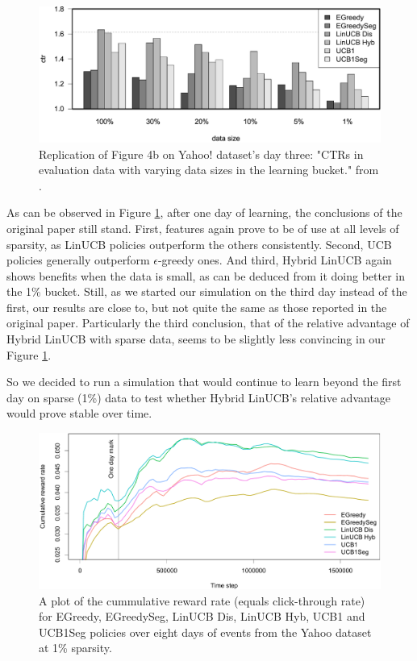 \documentclass{jss}
\begin{document}
\begin{figure}[H]
  \centering
    \includegraphics[width=.99\textwidth]{fig/section_8_bar}
      \caption{Replication of Figure 4b on Yahoo! dataset's day three: "CTRs in evaluation data with varying data sizes in the learning bucket." from \cite{Li2010}.}
      \label{fig:section_8_bar}
\end{figure}

As can be observed in Figure \ref{fig:section_8_bar}, after one day of learning, the conclusions of the original paper still stand. First, features again prove to be of use at all levels of sparsity, as LinUCB policies outperform the others consistently. Second, UCB policies generally outperform $\epsilon$-greedy ones. And third, Hybrid LinUCB again shows benefits when the data is small, as can be deduced from it doing better in the 1\% bucket. Still, as we started our simulation on the third day instead of the first, our results are close to, but not quite the same as those reported in the original paper. Particularly the third conclusion, that of the relative advantage of Hybrid LinUCB with sparse data, seems to be slightly less convincing in our Figure \ref{fig:section_8_bar}.

So we decided to run a simulation that would continue to learn beyond the first day on sparse (1\%) data to test whether Hybrid LinUCB's relative advantage would prove stable over time.

\begin{figure}[H]
  \centering
    \includegraphics[width=.99\textwidth]{fig/section_8_plot}
      \caption{A plot of the cummulative reward rate (equals click-through rate) for EGreedy, EGreedySeg, LinUCB Dis, LinUCB Hyb, UCB1 and UCB1Seg policies over eight days of events from the Yahoo dataset at 1\% sparsity.}
      \label{fig:section_8_plot}
\end{figure}
\end{document}
